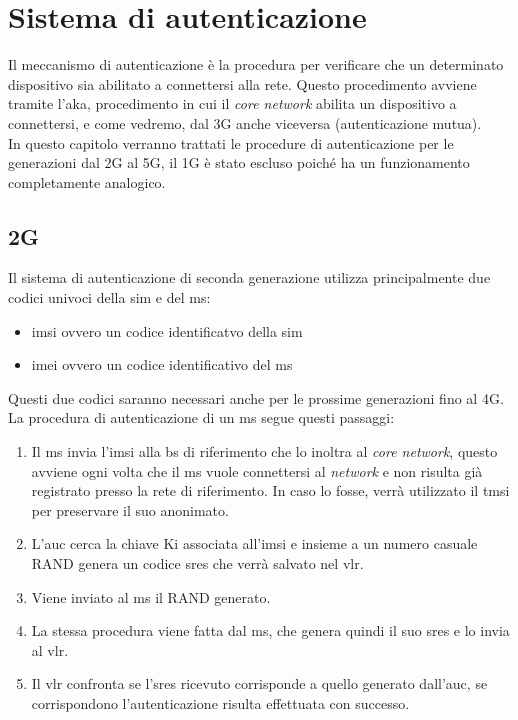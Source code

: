 \chapter{Sistema di autenticazione}
Il meccanismo di autenticazione è la procedura per verificare che un determinato dispositivo
sia abilitato a connettersi alla rete.
Questo procedimento avviene tramite l'\gls{aka}, procedimento in cui
il \textit{core network} abilita un dispositivo a connettersi, e come vedremo, dal 3G anche viceversa (autenticazione mutua).\\
In questo capitolo verranno trattati le procedure di autenticazione\cite{identifications} per le generazioni dal 2G al 5G, il 1G è stato escluso 
poiché ha un funzionamento completamente analogico.

\clearpage

\section{2G}
Il sistema di autenticazione di seconda generazione utilizza principalmente due codici univoci della \gls{sim} e del \gls{ms}:
\begin{itemize}
    \item \gls{imsi} ovvero un codice identificatvo della \gls{sim}
    \item \gls{imei} ovvero un codice identificativo del \gls{ms}
\end{itemize}
Questi due codici saranno necessari anche per le prossime generazioni fino al 4G.\\
La procedura di autenticazione di un \gls{ms} segue questi passaggi:
\begin{enumerate}
    \item Il \gls{ms} invia l'\gls{imsi} alla \gls{bs} di riferimento che lo inoltra al \textit{core network}, questo
    avviene ogni volta che il \gls{ms} vuole connettersi al \textit{network} e non risulta già registrato presso 
    la rete di riferimento. In caso lo fosse, verrà utilizzato il \gls{tmsi}
    per preservare il suo anonimato.
    \item L'\gls{auc} cerca la chiave Ki associata all'\gls{imsi} e insieme a un numero casuale RAND genera un codice \gls{sres} che verrà
    salvato nel \gls{vlr}.
    \item Viene inviato al \gls{ms} il RAND generato.
    \item La stessa procedura viene fatta dal \gls{ms}, che genera quindi il suo \gls{sres} e lo invia al \gls{vlr}.
    \item Il \gls{vlr} confronta se l'\gls{sres} ricevuto corrisponde a quello generato dall'\gls{auc}, se corrispondono l'autenticazione risulta
    effettuata con successo.
\end{enumerate}

